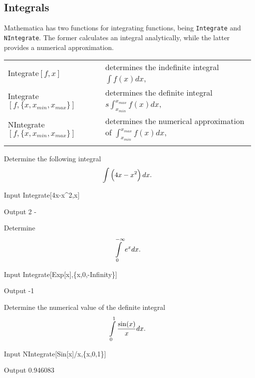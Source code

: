\subsection{Integrals}
Mathematica has two functions for integrating functions, being \lstinline{Integrate} and \lstinline{NIntegrate}. The former calculates an integral analytically, while the latter provides a numerical approximation.

\renewcommand{\arraystretch}{2.5}
\begin{tabular}{>{\hfill}p{5cm}p{12cm}}
	Integrate$[f,x]$				&			determines the indefinite integral $\int f(x) dx$,\\
	Integrate$[f,\{x,x_{min},x_{max}\}]$				&			determines the definite integral $ s\int^{x_{max}}_{x_{min}} f(x) dx$,\\
	NIntegrate$[f,\{x,x_{min},x_{max}\}]$				&			determines the numerical approximation of $\int^{x_{max}}_{x_{min}} f(x) dx$,\\
	\multicolumn{2}{l}{} 
\end{tabular}
\renewcommand{\arraystretch}{1}


\begin{example}
	Determine the following integral
	  $$ \displaystyle\int\left(4x - x^2\right) dx.$$
\begin{mdframed}[default,backgroundcolor=gray!40,roundcorner=8pt]
	
	\begin{mmaCell}[functionlocal={x_,x}]{Input}
		Integrate[4x-x^2,x]
	\end{mmaCell}
	\begin{mmaCell}{Output}
		2 - 
	\end{mmaCell}
\end{mdframed}
	Determine 
	 $$\displaystyle\int\limits^{-\infty}_0 e^x dx.$$

\begin{mdframed}[default,backgroundcolor=gray!40,roundcorner=8pt]
	\begin{mmaCell}[functionlocal={x_,x}]{Input}
		Integrate[Exp[x],\{x,0,-Infinity\}]
	\end{mmaCell}
	\begin{mmaCell}{Output}
		-1
	\end{mmaCell}
\end{mdframed}

	Determine the numerical value of the definite integral  $$\displaystyle\int\limits^{1}_0 \frac{\sin(x)}{x} dx.$$
	
\begin{mdframed}[default,backgroundcolor=gray!40,roundcorner=8pt]
	\begin{mmaCell}[functionlocal={y,x}]{Input}
		NIntegrate[Sin[x]/x,\{x,0,1\}]
	\end{mmaCell}
	\begin{mmaCell}{Output}
		0.946083
	\end{mmaCell}
	
\end{mdframed}
\end{example}


